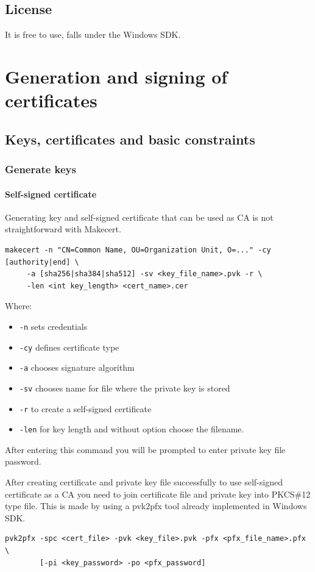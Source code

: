 \documentclass[10pt, a4paper]{report}
\begin{document}
  \subsection{License}
It is free to use, falls under the Windows SDK.
  
\section{Generation and signing of certificates}

  \subsection{Keys, certificates and basic constraints}
  
    \subsubsection{Generate keys}

      \paragraph{Self-signed certificate}
Generating key and self-signed certificate that can be used as CA is not straightforward with Makecert.
\begin{verbatim}
makecert -n "CN=Common Name, OU=Organization Unit, O=..." -cy [authority|end] \
	 -a [sha256|sha384|sha512] -sv <key_file_name>.pvk -r \
	 -len <int key_length> <cert_name>.cer
\end{verbatim}

Where:
\begin{itemize}
\item \verb+-n+ sets credentials
\item \verb+-cy+ defines certificate type
\item \verb+-a+ chooses signature algorithm
\item \verb+-sv+ chooses name for file where the private key is stored
\item \verb+-r+ to create a self-signed certificate
\item \verb+-len+ for key length and without option choose the filename.
\end{itemize}

After entering this command you will be prompted to enter private key file password.

After creating certificate and private key file successfully to use self-signed certificate as a CA you need to join certificate file and private key into PKCS\#12 type file. This is made by using a pvk2pfx tool already implemented in Windows SDK.
\begin{verbatim}
pvk2pfx -spc <cert_file> -pvk <key_file>.pvk -pfx <pfx_file_name>.pfx \
        [-pi <key_password> -po <pfx_password]
\end{verbatim}
\end{document}
